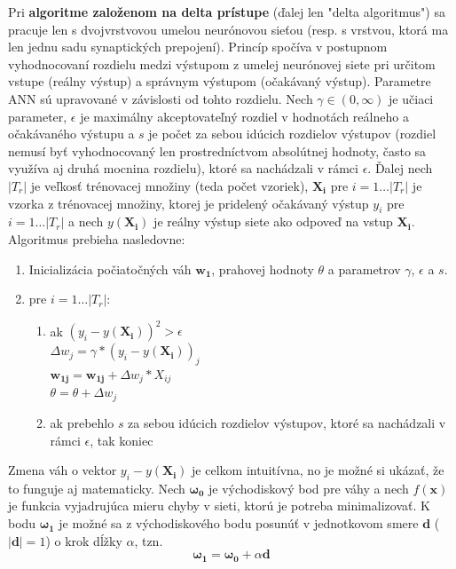 Pri \textbf{algoritme založenom na delta prístupe} (ďalej len "delta algoritmus") sa pracuje len s dvojvrstvovou
umelou neurónovou sieťou (resp. s vrstvou, ktorá ma len jednu sadu synaptických prepojení).
Princíp spočíva v postupnom vyhodnocovaní rozdielu medzi výstupom z umelej neurónovej siete pri určitom vstupe
(reálny výstup) a správnym výstupom (očakávaný výstup).
Parametre ANN sú upravované v závislosti od tohto rozdielu.
Nech $\gamma \in (0, \infty)$ je učiaci parameter, $\epsilon$ je maximálny akceptovateľný rozdiel v hodnotách reálneho
a očakávaného výstupu a $s$ je počet za sebou idúcich rozdielov výstupov (rozdiel nemusí byť vyhodnocovaný len
prostredníctvom absolútnej hodnoty, často sa využíva aj druhá mocnina rozdielu), ktoré sa nachádzali v rámci $\epsilon$.
Ďalej nech $|T_r|$ je veľkosť trénovacej množiny (teda počet vzoriek), $\mathbf{X_i}$ pre $i=1 \dots |T_r|$ je vzorka
z trénovacej množiny, ktorej je pridelený očakávaný výstup $y_i$ pre $i=1 \dots |T_r|$ a nech $y(\mathbf{X_i})$ je reálny
výstup siete ako odpoveď na vstup $\mathbf{X_i}$.
Algoritmus prebieha nasledovne:\cite{algo_ann_delta_rule}
\begin{enumerate}
    \item Inicializácia počiatočných váh $\pmb{w_1}$, prahovej hodnoty $\theta$ a parametrov $\gamma$, $\epsilon$ a $s$.
    \item pre $i = 1 \dots |T_r|$:
    \begin{enumerate}
        \item ak $(y_i-y(\mathbf{X_i}))^2>\epsilon$ \\
                $\Delta{w_j} = \gamma * (y_i-y(\mathbf{X_i}))_j$ \\
                $\pmb{w_{1j}}=\pmb{w_{1j}} + \Delta{w_j} * X_{ij}$ \\
                $\theta=\theta + \Delta{w_j}$
        \item ak prebehlo $s$ za sebou idúcich rozdielov výstupov, ktoré sa nachádzali v rámci $\epsilon$, tak koniec
    \end{enumerate}
\end{enumerate}
Zmena váh o vektor $y_i-y(\mathbf{X_i})$ je celkom intuitívna, no je možné si ukázať, že to funguje aj matematicky.
Nech $\pmb{\omega_0}$ je východiskový bod pre váhy a nech $f(\pmb{x})$ je funkcia vyjadrujúca mieru chyby v sieti,
ktorú je potreba minimalizovať.
K bodu $\pmb{\omega_1}$ je možné sa z východiskového bodu posunúť v jednotkovom smere $\pmb{d}$ ($|\pmb{d}|=1$) o krok
dĺžky $\alpha$, tzn.
\begin{equation}
    \pmb{\omega_1} = \pmb{\omega_0} + \alpha\pmb{d}
\end{equation}

